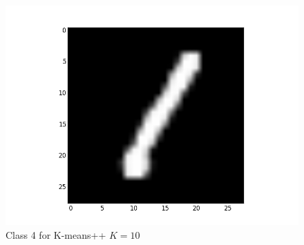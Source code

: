\documentclass[submit]{harvardml}
\begin{document}
\begin{figure}[ht]
    \includegraphics[scale=0.20]{K10-representative-3-2}
    \caption{Class 4 for K-means++ $K=10$}
\end{figure}
\end{document}

